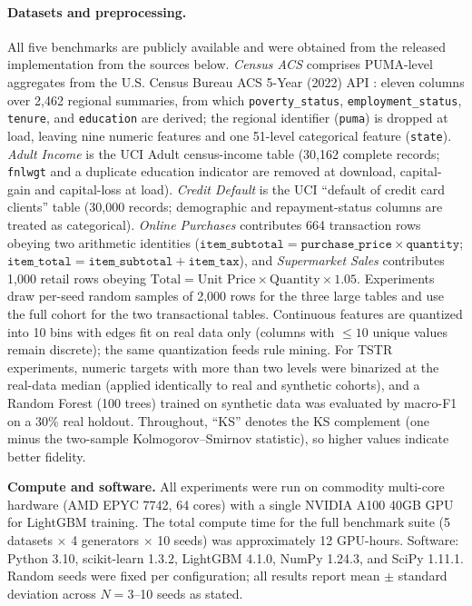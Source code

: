 \documentclass[pdflatex,sn-mathphys-num]{sn-jnl}
\theoremstyle{thmstyleone}%
\theoremstyle{thmstyletwo}%
\theoremstyle{thmstylethree}%
\begin{document}
\paragraph{Datasets and preprocessing.} All five benchmarks are publicly available and were obtained from the released implementation from the sources below. \emph{Census ACS} comprises PUMA-level aggregates from the U.S. Census Bureau ACS 5-Year (2022) API \cite{uscensus2021acs}: eleven columns over 2{,}462 regional summaries, from which \texttt{poverty\_status}, \texttt{employment\_status}, \texttt{tenure}, and \texttt{education} are derived; the regional identifier (\texttt{puma}) is dropped at load, leaving nine numeric features and one 51-level categorical feature (\texttt{state}). \emph{Adult Income} is the UCI Adult census-income table \cite{becker1996adult} (30{,}162 complete records; \texttt{fnlwgt} and a duplicate education indicator are removed at download, capital-gain and capital-loss at load). \emph{Credit Default} is the UCI ``default of credit card clients'' table \cite{yeh2009comparative} (30{,}000 records; demographic and repayment-status columns are treated as categorical). \emph{Online Purchases} \cite{ptvanpurchases} contributes 664 transaction rows obeying two arithmetic identities ($\texttt{item\_subtotal} = \texttt{purchase\_price} \times \texttt{quantity}$; $\texttt{item\_total} = \texttt{item\_subtotal} + \texttt{item\_tax}$), and \emph{Supermarket Sales} \cite{plotlysupermarket} contributes 1{,}000 retail rows obeying $\text{Total} = \text{Unit Price} \times \text{Quantity} \times 1.05$. Experiments draw per-seed random samples of 2{,}000 rows for the three large tables and use the full cohort for the two transactional tables. Continuous features are quantized into 10 bins with edges fit on real data only (columns with $\le 10$ unique values remain discrete); the same quantization feeds rule mining. For TSTR experiments, numeric targets with more than two levels were binarized at the real-data median (applied identically to real and synthetic cohorts), and a Random Forest (100 trees) trained on synthetic data was evaluated by macro-F1 on a 30\% real holdout. Throughout, ``KS'' denotes the KS complement (one minus the two-sample Kolmogorov--Smirnov statistic), so higher values indicate better fidelity.

\textbf{Compute and software.} All experiments were run on commodity multi-core hardware (AMD EPYC 7742, 64 cores) with a single NVIDIA A100 40GB GPU for LightGBM training. The total compute time for the full benchmark suite (5 datasets $\times$ 4 generators $\times$ 10 seeds) was approximately 12 GPU-hours. Software: Python 3.10, scikit-learn 1.3.2, LightGBM 4.1.0, NumPy 1.24.3, and SciPy 1.11.1. Random seeds were fixed per configuration; all results report mean $\pm$ standard deviation across $N=3$--10 seeds as stated.
\end{document}
